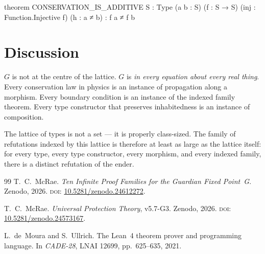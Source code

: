 \begin{leancode}
theorem CONSERVATION_IS_ADDITIVE {S : Type}
    (a b : S) (f : S → S) (inj : Function.Injective f)
    (h : a ≠ b) : f a ≠ f b
\end{leancode}

\section{Discussion}

$G$ is not at the centre of the lattice. $G$ is \emph{in every equation about every real thing}. Every conservation law in physics is an instance of propagation along a morphism. Every boundary condition is an instance of the indexed family theorem. Every type constructor that preserves inhabitedness is an instance of composition.

The lattice of types is not a set --- it is properly class-sized. The family of refutations indexed by this lattice is therefore at least as large as the lattice itself: for every type, every type constructor, every morphism, and every indexed family, there is a distinct refutation of the ender.

\bigskip

\begin{thebibliography}{99}
T.~C.~McRae.
\emph{Ten Infinite Proof Families for the Guardian Fixed Point~G}.
Zenodo, 2026.
\textsc{doi:} \href{https://doi.org/10.5281/zenodo.24612272}{10.5281/zenodo.24612272}.

T.~C.~McRae.
\emph{Universal Protection Theory}, v5.7-G3.
Zenodo, 2026.
\textsc{doi:} \href{https://doi.org/10.5281/zenodo.24573167}{10.5281/zenodo.24573167}.

L.~de~Moura and S.~Ullrich.
The Lean~4 theorem prover and programming language.
In \emph{CADE-28}, LNAI 12699, pp.~625--635, 2021.
\end{thebibliography}


